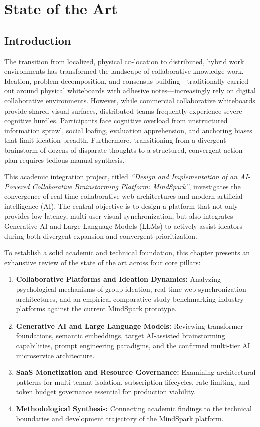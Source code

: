 \chapter{State of the Art}
\label{chap:state_of_the_art}

\section{Introduction}
\label{sec:intro}

The transition from localized, physical co-location to distributed, hybrid work environments has transformed the landscape of collaborative knowledge work. Ideation, problem decomposition, and consensus building---traditionally carried out around physical whiteboards with adhesive notes---increasingly rely on digital collaborative environments. However, while commercial collaborative whiteboards provide shared visual surfaces, distributed teams frequently experience severe cognitive hurdles. Participants face cognitive overload from unstructured information sprawl, social loafing, evaluation apprehension, and anchoring biases that limit ideation breadth. Furthermore, transitioning from a divergent brainstorm of dozens of disparate thoughts to a structured, convergent action plan requires tedious manual synthesis.

This academic integration project, titled \textit{``Design and Implementation of an AI-Powered Collaborative Brainstorming Platform: MindSpark''}, investigates the convergence of real-time collaborative web architectures and modern artificial intelligence (AI). The central objective is to design a platform that not only provides low-latency, multi-user visual synchronization, but also integrates Generative AI and Large Language Models (LLMs) to actively assist ideators during both divergent expansion and convergent prioritization.

To establish a solid academic and technical foundation, this chapter presents an exhaustive review of the state of the art across four core pillars:
\begin{enumerate}
    \item \textbf{Collaborative Platforms and Ideation Dynamics:} Analyzing psychological mechanisms of group ideation, real-time web synchronization architectures, and an empirical comparative study benchmarking industry platforms against the current MindSpark prototype.
    \item \textbf{Generative AI and Large Language Models:} Reviewing transformer foundations, semantic embeddings, target AI-assisted brainstorming capabilities, prompt engineering paradigms, and the confirmed multi-tier AI microservice architecture.
    \item \textbf{SaaS Monetization and Resource Governance:} Examining architectural patterns for multi-tenant isolation, subscription lifecycles, rate limiting, and token budget governance essential for production viability.
    \item \textbf{Methodological Synthesis:} Connecting academic findings to the technical boundaries and development trajectory of the MindSpark platform.
\end{enumerate}

